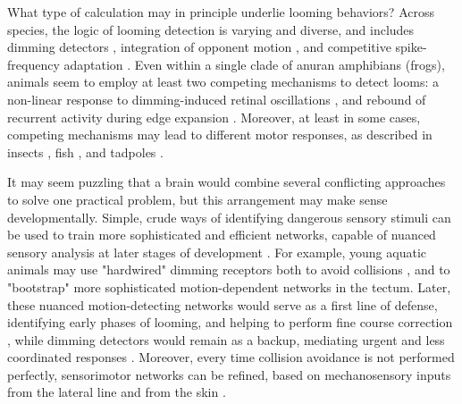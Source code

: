 \documentclass{article}
\begin{document}
What type of calculation may in principle underlie looming behaviors? Across species, the logic of looming detection is varying and diverse, and includes dimming detectors \citep{ishikane2005,munch2009}, integration of opponent motion \citep{klapoetke2017looming}, and competitive spike-frequency adaptation \citep{peron2009adaptation,fotowat2011multiplexing}. Even within a single clade of anuran amphibians (frogs), animals seem to employ at least two competing mechanisms to detect looms: a non-linear response to dimming-induced retinal oscillations \citep{baranauskas2012}, and rebound of recurrent activity during edge expansion \citep{khakhalin2014,jang2016}. Moreover, at least in some cases, competing mechanisms may lead to different motor responses, as described in insects \citep{card2008tradeoffs,chan2013avoidance}, fish \citep{burgess2007twoescapes,portugues2009behaviors,budick2000repertoire,temizer2015pathway,bhattacharyya2017assessment}, and tadpoles \citep{khakhalin2014}.

It may seem puzzling that a brain would combine several conflicting approaches to solve one practical problem, but this arrangement may make sense developmentally. Simple, crude ways of identifying dangerous sensory stimuli can be used to train more sophisticated and efficient networks, capable of nuanced sensory analysis at later stages of development \citep{marblestone2016deeplearning}. For example, young aquatic animals may use "hardwired" dimming receptors \citep{baranauskas2012} both to avoid collisions \citep{dong2009}, and to "bootstrap" more sophisticated motion-dependent networks in the tectum. Later, these nuanced motion-detecting networks would serve as a first line of defense, identifying early phases of looming, and helping to perform fine course correction \citep{khakhalin2014,bhattacharyya2017assessment}, while dimming detectors would remain as a backup, mediating urgent and less coordinated responses \citep{khakhalin2014}. Moreover, every time collision avoidance is not performed perfectly, sensorimotor networks can be refined, based on mechanosensory inputs from the lateral line and from the skin \citep{felch2016, helmbrecht2018topography}.
\end{document}
